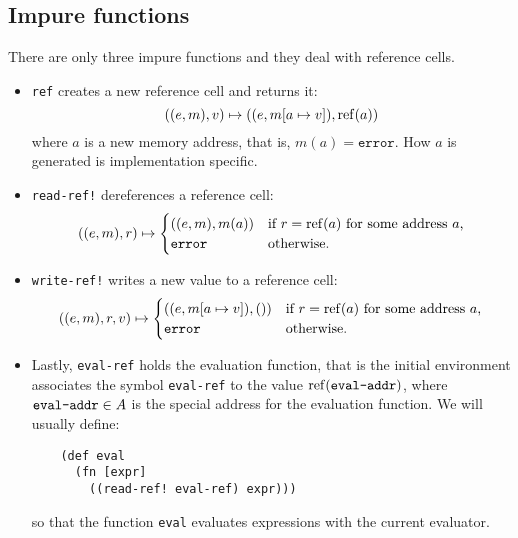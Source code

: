 \subsection{Impure functions}

There are only three impure functions and they deal with reference cells.
\begin{itemize}
\item \texttt{ref} creates a new reference cell and returns it:
  \[
    ((e,m), v) \mapsto ((e,m[a \mapsto v]), \mathrm{ref}(a))
  \]
  where $a$ is a new memory address, that is, $m(a) = \mathtt{error}$. How $a$
  is generated is implementation specific.
\item \texttt{read-ref!} dereferences a reference cell:
  \[
    ((e,m), r) \mapsto
    \begin{cases}
      ((e,m), m(a)) & \text{if $r = \mathrm{ref}(a)$ for some address $a$,}\\
      \mathtt{error} & \text{otherwise.}
    \end{cases}
  \]
\item \texttt{write-ref!} writes a new value to a reference cell:
  \[
    ((e,m), r, v) \mapsto
    \begin{cases}
      ((e,m[a \mapsto v]), ()) & \text{if $r = \mathrm{ref}(a)$ for some address $a$,}\\
      \mathtt{error} & \text{otherwise.}
    \end{cases}
  \]
\item Lastly, \texttt{eval-ref} holds the evaluation function, that is the
  initial environment associates the symbol \texttt{eval-ref} to the value
  $\mathrm{ref}(\text{\texttt{eval-addr}})$, where $\text{\texttt{eval-addr}} \in A$ is the special address for the
  evaluation function. We will usually define:
  \begin{lstlisting}
    (def eval
      (fn [expr]
        ((read-ref! eval-ref) expr)))
  \end{lstlisting}
  so that the function \texttt{eval} evaluates expressions with the current evaluator.
\end{itemize}
